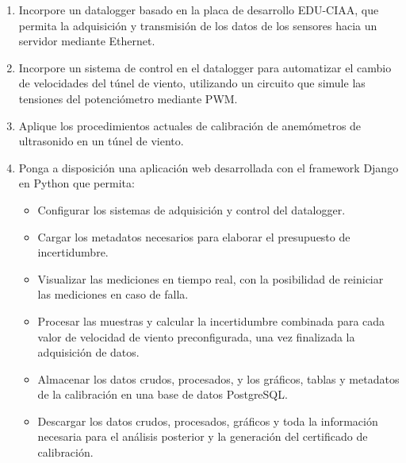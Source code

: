 \begin{enumerate}
    \item Incorpore un datalogger basado en la placa de desarrollo EDU-CIAA, que permita la adquisición y transmisión de los datos de los sensores hacia un servidor mediante Ethernet.
    \item Incorpore un sistema de control en el datalogger para automatizar el cambio de velocidades del túnel de viento, utilizando un circuito que simule las tensiones del potenciómetro mediante PWM.
    \item Aplique los procedimientos actuales de calibración de anemómetros de ultrasonido en un túnel de viento.
    \item Ponga a disposición una aplicación web desarrollada con el framework Django en Python que permita:
    \begin{itemize}
        \item Configurar los sistemas de adquisición y control del datalogger.
        \item Cargar los metadatos necesarios para elaborar el presupuesto de incertidumbre.
        \item Visualizar las mediciones en tiempo real, con la posibilidad de reiniciar las mediciones en caso de falla.
        \item Procesar las muestras y calcular la incertidumbre combinada para cada valor de velocidad de viento preconfigurada, una vez finalizada la adquisición de datos.
        \item Almacenar los datos crudos, procesados, y los gráficos, tablas y metadatos de la calibración en una base de datos PostgreSQL.
        \item Descargar los datos crudos, procesados, gráficos y toda la información necesaria para el análisis posterior y la generación del certificado de calibración.
    \end{itemize}
\end{enumerate}
